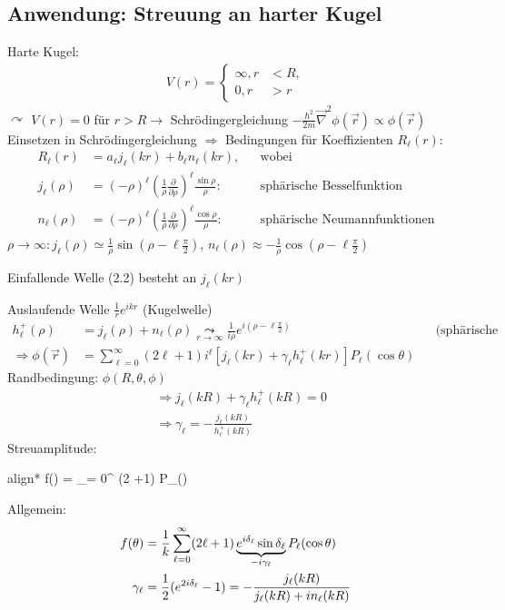 \subsection{Anwendung: Streuung an harter Kugel} 
	Harte Kugel:
	\begin{align*}
	V (r) =
	\left\{
	\begin{aligned}
	\infty , r &< R, \\
	0 , r &> r
	\end{aligned}
	\right.
	\end{align*}
	$\curvearrowright$ 
	$V(r)= 0$ für $r>R \rightarrow$ Schrödingergleichung $-\frac{\hbar^2}{2m} \vec{\nabla}^2 \phi(\vec{r})
	\propto \phi(\vec{r})$
	Einsetzen in Schrödingergleichung $\Rightarrow$ Bedingungen für Koeffizienten $R_\ell(r)$:
		\begin{align*}
			R_\ell(r) &= a_\ell j_\ell (kr) + b_\ell n_\ell (kr) ,& &\text{wobei}\\
			j_\ell(\rho) &= (-\rho)^\ell \left(\frac{1}{\rho} \frac{\partial}{\partial \rho}\right)^\ell
			\frac{\sin \rho}{\rho} :& &\text{sphärische Besselfunktion}\\
			n_\ell(\rho) &= (-\rho)^\ell \left(\frac{1}{\rho} \frac{\partial}{\partial \rho}\right)^\ell
			\frac{\cos \rho}{\rho} :& &\text{sphärische Neumannfunktionen}
		\end{align*}
	$\rho \rightarrow \infty : j_\ell (\rho) \simeq \frac{1}{\rho} \sin(\rho-\ell\frac{\pi}{2})$,
	$n_\ell (\rho) \approx -\frac{1}{\rho}  \cos(\rho-\ell\frac{\pi}{2})$
	
	Einfallende Welle (2.2) besteht an $j_\ell (kr)$
	
	Auslaufende Welle $ %
	\frac{1}{r} e^{ikr}$ (Kugelwelle)
		\begin{align*}
			h_\ell^+ (\rho) &= j_\ell (\rho) + n_\ell(\rho) \underset{r \rightarrow \infty}{\leadsto} 
			\frac{1}{i\rho} e^{i(\rho-\ell\frac{\pi}{2})} &
			&\text{(sphärische Hantelfunktion 1ter Art)} \\
			\Rightarrow \phi (\vec{r}) &= \sum_{\ell=0}^{\infty} (2 \ell +1) i^\ell
			\left[ j_\ell (kr) +\gamma_\ell h^+_\ell (kr)
			\right] P_\ell (\cos \theta)
		\end{align*}
	Randbedingung: $\phi (R, \theta, \phi)$
		\begin{align*}
			&\Rightarrow j_\ell (kR) + \gamma_\ell h_\ell^+(kR) = 0\\
			&\Rightarrow \gamma_\ell = -\frac{j_\ell(kR)}{h_\ell^+ (kR)}
		\end{align*}
	Streuamplitude:
		\begin{empheq}[box=\boxed]{align*}
			f(\theta) = \sum_{\ell = 0}^{\infty} (2 \ell +1)  P_\ell(\cos \theta)
		\end{empheq}
	Allgemein:
		\begin{align*}
			f(\theta) &= \frac{1}{k} \sum_{\ell = 0}^{\infty}
			(2 \ell + 1) \underbrace{e^{i\delta_\ell} \sin \delta_\ell}_{\mathclap{-i \gamma_\ell}}
			P_\ell (\cos \theta) \\
			\gamma_\ell &= \frac{1}{2} (e^{2i\delta_\ell} - 1)
			= -\frac{j_\ell(kR)}{j_\ell(kR)+ in_\ell (kR)}
		\end{align*}
		
